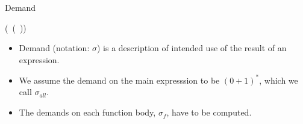 \documentclass[xcolor=x11names,compress,mathserif]{beamer}
\renewcommand{\(}{\begin{columns}}
\renewcommand{\)}{\end{columns}}
\newcommand{\<}[1]{\begin{column}{#1}}
\renewcommand{\>}{\end{column}}
\begin{document}
\begin{frame}{Demand}
  \begin{center}
     (\CAR\ (\CDR\ \pw)) \\
  \end{center}
  \pause
\centerline{}
  \begin{itemize}
  \item Demand  (notation: $\sigma$) is a description  of intended use
    of the result of an expression.
   \pause
\item We assume the demand on the main expresssion to be $(0+1)^*$,
  which we call $\sigma_{all}$.
\item The demands on each function body, $\sigma_f$, have to be computed.
  \end{itemize}




\end{frame}
\end{document}
